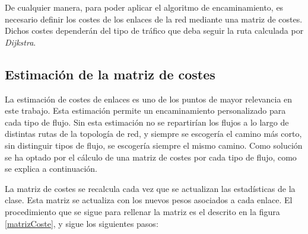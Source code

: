 \documentclass[a4paper,11pt]{book}
\begin{document}
 De cualquier manera, para poder aplicar el algoritmo de encaminamiento, es necesario definir los costes de los enlaces de la red mediante una matriz de costes. Dichos costes dependerán del tipo de tráfico que deba seguir la ruta calculada por \textit{Dijkstra}.  

\subsection{Estimación de la matriz de costes} 
\label{costes}

La estimación de costes de enlaces es uno de los puntos de mayor relevancia en este trabajo. Esta estimación permite un encaminamiento personalizado para cada tipo de flujo. Sin esta estimación no se repartirían los flujos a lo largo de distintas rutas de la topología de red, y siempre se escogería el camino más corto, sin distinguir tipos de flujo, se escogería siempre el mismo camino. 
 Como solución se ha optado por el cálculo de una matriz de costes por cada tipo de flujo, como se explica a continuación.

La matriz de costes se recalcula cada vez que se actualizan las estadísticas de la clase. Esta matriz se actualiza con los nuevos pesos asociados a cada enlace. El procedimiento que se sigue para rellenar la matriz es el descrito en la figura \ref{matrizCoste}, y sigue los siguientes pasos:
\end{document}
